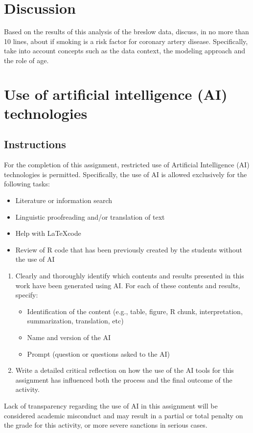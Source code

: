\documentclass[10pt,a4paper,twoside]{article}\usepackage[]{graphicx}\usepackage[]{xcolor}
\begin{document}
\section{Discussion}
\label{sec:Discussion}

Based on the results of this analysis of the breslow data, discuss, in no more than 10 lines, about if smoking is a risk factor for coronary artery disease. Specifically, take into account concepts such as the data context, the modeling approach and the role of age.

\section{Use of artificial intelligence (AI) technologies}
\label{sec:AIuse}
\subsection{Instructions}
\label{sec:Instructions}
For the completion of this assignment, restricted use of Artificial Intelligence (AI) technologies is permitted. Specifically, the use of AI is allowed exclusively for the following tasks:

\begin{itemize}
    \item Literature or information search
    \item Linguistic proofreading and/or translation of text
    \item Help with \LaTeX code
    \item Review of R code that has been previously created by the students without the use of AI
\end{itemize}
\begin{enumerate}
    \item Clearly and thoroughly identify which contents and results presented in this work have been generated using AI. For each of these contents and results, specify:
    \begin{itemize}
        \item  Identification of the content (e.g., table, figure, R chunk, interpretation, summarization, translation, etc)
        \item Name and version of the AI
        \item Prompt (question or questions asked to the AI)
    \end{itemize}
    \item Write a detailed critical reflection on how the use of the AI tools for this assignment has influenced both the process and the final outcome of the activity.
\end{enumerate}
Lack of transparency regarding the use of AI in this assignment will be considered academic misconduct and may result in a partial or total penalty on the grade for this activity, or more severe sanctions in serious cases.
\end{document}
